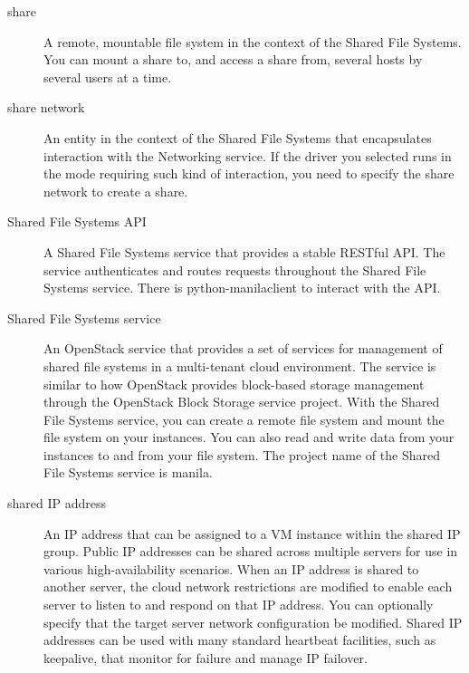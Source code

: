 \documentclass[letterpaper,10pt,english]{sphinxmanual}
\begin{document}
\begin{description}
\item[{share}] \leavevmode{}\label{_source/glossary:term-share}
A remote, mountable file system in the context of the Shared File
Systems. You can mount a share to, and access a share from, several
hosts by several users at a time.

\item[{share network}] \leavevmode{}\label{_source/glossary:term-share-network}
An entity in the context of the Shared File Systems that
encapsulates interaction with the Networking service. If the driver
you selected runs in the mode requiring such kind of interaction, you
need to specify the share network to create a share.

\item[{Shared File Systems API}] \leavevmode{}\label{_source/glossary:term-shared-file-systems-api}
A Shared File Systems service that provides a stable RESTful API.
The service authenticates and routes requests throughout the Shared
File Systems service. There is python-manilaclient to interact with
the API.

\item[{Shared File Systems service}] \leavevmode{}\label{_source/glossary:term-shared-file-systems-service}
An OpenStack service that provides a set of services for
management of shared file systems in a multi-tenant cloud
environment. The service is similar to how OpenStack provides
block-based storage management through the OpenStack Block Storage
service project. With the Shared File Systems service, you can create
a remote file system and mount the file system on your instances. You
can also read and write data from your instances to and from your
file system. The project name of the Shared File Systems service is
manila.

\item[{shared IP address}] \leavevmode{}\label{_source/glossary:term-shared-ip-address}
An IP address that can be assigned to a VM instance within the
shared IP group. Public IP addresses can be shared across multiple
servers for use in various high-availability scenarios. When an IP
address is shared to another server, the cloud network restrictions
are modified to enable each server to listen to and respond on that IP
address. You can optionally specify that the target server network
configuration be modified. Shared IP addresses can be used with many
standard heartbeat facilities, such as keepalive, that monitor for
failure and manage IP failover.


\end{description}
\end{document}

